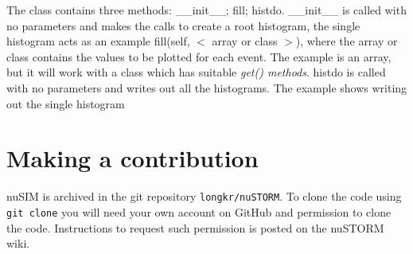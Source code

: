  \noindent The class contains three methods: \_\_init\_\_; fill; histdo.\newline
 \_\_init\_\_ is called with no parameters and makes the calls to create a root histogram, the single histogram acts as
 an example\newline
fill(self, $<$ array or class $>$), where the array or class contains the values to be plotted for each event. The example is an array, but it will work  with a class which has suitable {\it get() methods}.\newline
histdo is called with no parameters and writes out all the histograms. The example shows writing out the single histogram
 
 
\section*{Making a contribution}
nuSIM is archived in the git repository \verb+longkr/nuSTORM+.
To clone the code using
\verb+git clone+ you will need your own account on GitHub and
permission to clone the code. 
Instructions to request such permission is posted on the nuSTORM
wiki.

